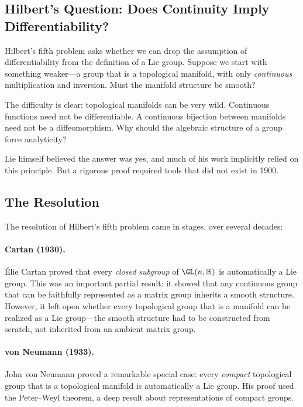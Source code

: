 \subsection{Hilbert's Question: Does Continuity Imply Differentiability?}

Hilbert's fifth problem asks whether we can drop the assumption of differentiability from the definition of a Lie group. Suppose we start with something weaker---a group that is a topological manifold, with only \emph{continuous} multiplication and inversion. Must the manifold structure be smooth?

The difficulty is clear: topological manifolds can be very wild. Continuous functions need not be differentiable. A continuous bijection between manifolds need not be a diffeomorphism. Why should the algebraic structure of a group force analyticity?

Lie himself believed the answer was yes, and much of his work implicitly relied on this principle. But a rigorous proof required tools that did not exist in 1900.

\subsection{The Resolution}

The resolution of Hilbert's fifth problem came in stages, over several decades:

\paragraph{Cartan (1930).} Élie Cartan proved that every \emph{closed subgroup} of $\GL(n,\mathbb{R})$ is automatically a Lie group. This was an important partial result: it showed that any continuous group that can be faithfully represented as a matrix group inherits a smooth structure. However, it left open whether every topological group that is a manifold can be realized as a Lie group---the smooth structure had to be constructed from scratch, not inherited from an ambient matrix group.

\paragraph{von Neumann (1933).} John von Neumann proved a remarkable special case: every \emph{compact} topological group that is a topological manifold is automatically a Lie group. His proof used the Peter--Weyl theorem, a deep result about representations of compact groups.

